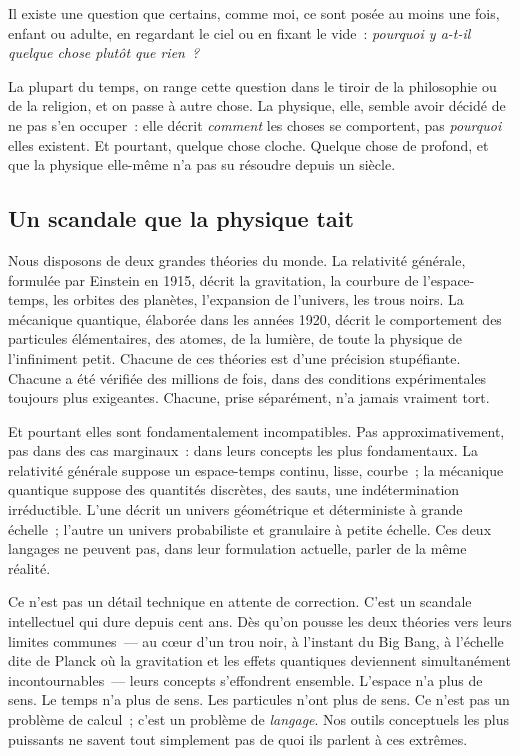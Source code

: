 \documentclass[12pt, a4paper, openright]{book}
\begin{document}
Il existe une question que certains, comme moi, ce sont posée au moins une fois, enfant ou adulte, en regardant le ciel ou en fixant le vide~: \emph{pourquoi y a-t-il quelque chose plutôt que rien~?}

\medskip

La plupart du temps, on range cette question dans le tiroir de la philosophie ou de la religion, et on passe à autre chose. La physique, elle, semble avoir décidé de ne pas s'en occuper~: elle décrit \emph{comment} les choses se comportent, pas \emph{pourquoi} elles existent. Et pourtant, quelque chose cloche. Quelque chose de profond, et que la physique elle-même n'a pas su résoudre depuis un siècle.

\subsection*{Un scandale que la physique tait}

Nous disposons de deux grandes théories du monde. La relativité générale, formulée par Einstein en 1915, décrit la gravitation, la courbure de l'espace-temps, les orbites des planètes, l'expansion de l'univers, les trous noirs. La mécanique quantique, élaborée dans les années 1920, décrit le comportement des particules élémentaires, des atomes, de la lumière, de toute la physique de l'infiniment petit. Chacune de ces théories est d'une précision stupéfiante. Chacune a été vérifiée des millions de fois, dans des conditions expérimentales toujours plus exigeantes. Chacune, prise séparément, n'a jamais vraiment tort.

\medskip

Et pourtant elles sont fondamentalement incompatibles. Pas approximativement, pas dans des cas marginaux~: dans leurs concepts les plus fondamentaux. La relativité générale suppose un espace-temps continu, lisse, courbe~; la mécanique quantique suppose des quantités discrètes, des sauts, une indétermination irréductible. L'une décrit un univers géométrique et déterministe à grande échelle~; l'autre un univers probabiliste et granulaire à petite échelle. Ces deux langages ne peuvent pas, dans leur formulation actuelle, parler de la même réalité.

\medskip

Ce n'est pas un détail technique en attente de correction. C'est un scandale intellectuel qui dure depuis cent ans. Dès qu'on pousse les deux théories vers leurs limites communes~--- au c\oe{}ur d'un trou noir, à l'instant du Big Bang, à l'échelle dite de Planck où la gravitation et les effets quantiques deviennent simultanément incontournables~--- leurs concepts s'effondrent ensemble. L'espace n'a plus de sens. Le temps n'a plus de sens. Les particules n'ont plus de sens. Ce n'est pas un problème de calcul~; c'est un problème de \emph{langage}. Nos outils conceptuels les plus puissants ne savent tout simplement pas de quoi ils parlent à ces extrêmes.
\end{document}
